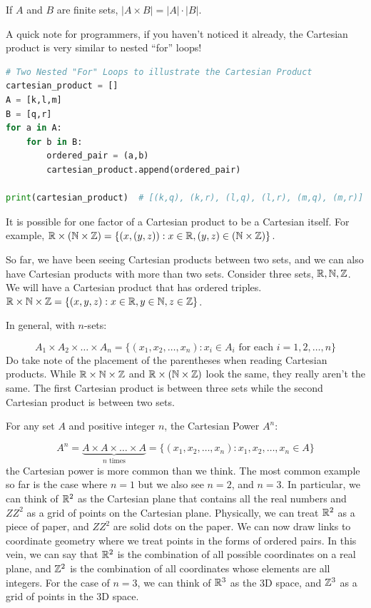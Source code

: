 \documentclass[../Latex-Setup/setup.tex]{subfiles}
\begin{document}
If $A$ and $B$ are finite sets, $|A \times B| = |A| \cdot |B|$.\par

A quick note for programmers, if you haven't noticed it already, the Cartesian product is very similar to nested ``for'' loops!
\begin{lstlisting}[language=Python]
# Two Nested "For" Loops to illustrate the Cartesian Product
cartesian_product = []
A = [k,l,m]
B = [q,r]
for a in A:
    for b in B:
        ordered_pair = (a,b)
        cartesian_product.append(ordered_pair)

print(cartesian_product)  # [(k,q), (k,r), (l,q), (l,r), (m,q), (m,r)]
\end{lstlisting}
\par

It is possible for one factor of a Cartesian product to be a Cartesian itself.
For example, $\mathbb R \times (\mathbb N \times \mathbb Z) = \{(x, (y,z)) : x \in \mathbb R, (y,z) \in (\mathbb N \times \mathbb Z)\}$.\par

So far, we have been seeing Cartesian products between two sets, and we can also have Cartesian products with more than two sets.
Consider three sets, $\mathbb R, \mathbb N, \mathbb Z$. We will have a Cartesian product that has ordered triples.
$\mathbb R \times \mathbb N \times \mathbb Z = \{(x,y,z) : x \in \mathbb R, y \in \mathbb N, z \in \mathbb Z\}$.\par

In general, with $n$-sets:

\[A_1 \times A_2 \times \dots \times A_n = \{(x_1,x_2,\dots,x_n) : x_i \in A_i \text{ for each } i = 1,2,\dots,n\}\]
Do take note of the placement of the parentheses when reading Cartesian products.
While $\mathbb R \times \mathbb N \times \mathbb Z$ and $\mathbb R \times (\mathbb N \times \mathbb Z)$ look the same, they really aren't the same.
The first Cartesian product is between three sets while the second Cartesian product is between two sets.\par

For any set $A$ and positive integer $n$, the Cartesian Power $A^n$:

\[A^n = \underbrace{A \times A \times \dots \times A}_{n \text{ times}} = \{(x_1,x_2,\dots,x_n) : x_1,x_2,\dots,x_n \in A\}\]
the Cartesian power is more common than we think. The most common example so far is the case where $n = 1$ but we also see $n = 2$, and $n = 3$.
In particular, we can think of $\mathbb R^2$ as the Cartesian plane that contains all the real numbers and $ZZ^2$ as a grid of points on the Cartesian plane.
Physically, we can treat $\mathbb R^2$ as a piece of paper, and $ZZ^2$ are solid dots on the paper.
We can now draw links to coordinate geometry where we treat points in the forms of ordered pairs.
In this vein, we can say that $\mathbb R^2$ is the combination of all possible coordinates on a real plane,
and $\mathbb Z^2$ is the combination of all coordinates whose elements are all integers.
For the case of $n = 3$, we can think of $\mathbb R^3$ as the 3D space, and $\mathbb Z^3$ as a grid of points in the 3D space.\par
\end{document}
